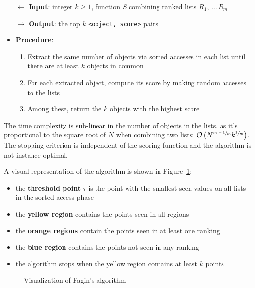 \documentclass[english]{article}
\begin{document}
\begin{itemize}
  \item[\(\leftarrow\)] \textbf{Input}: integer \(k \geq 1\), function \(S\) combining ranked lists \(R_1, \,\ldots\, R_m\)
  \item[\(\rightarrow\)] \textbf{Output}: the top \(k\) \texttt{<object, score>} pairs
  \item \textbf{Procedure}:
        \begin{enumerate}[label=step \arabic*., ref=step (\arabic*), widest*=7, leftmargin=*, labelindent=1em]
          \item Extract the same number of objects via sorted accesses in each list until there are at least \(k\) objects in common
          \item For each extracted object, compute its score by making random accesses to the lists
          \item Among these, return the \(k\) objects with the highest score
        \end{enumerate}
\end{itemize}

The time complexity is sub-linear in the number of objects in the lists, as it's proportional to the square root of \(N\) when combining two lists: \(\mathcal{O}\left( N^{\sfrac{m-1}{m}} k^{\sfrac{1}{m}} \right)\).
The stopping criterion is independent of the scoring function and the algorithm is not instance-optimal.

A visual representation of the algorithm is shown in Figure~\ref{fig:fagin-algorithm}:

\begin{itemize}
  \item the \textbf{threshold point} \(\tau\) is the point with the smallest seen values on all lists in the sorted access phase
  \item the \textbf{yellow region} contains the points seen in all regions
  \item the \textbf{orange regions} contain the points seen in at least one ranking
  \item the \textbf{blue region} contains the points not seen in any ranking
  \item the algorithm stops when the yellow region contains at least \(k\) points
\end{itemize}

\begin{figure}[htbp]
  \centering
  \bigskip
  \caption{Visualization of Fagin's algorithm}
  \label{fig:fagin-algorithm}
  \bigskip
\end{figure}
\end{document}
